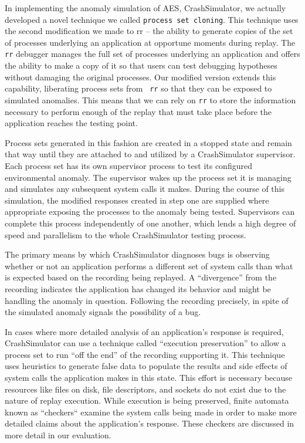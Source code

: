 In implementing the anomaly simulation of AES,
CrashSimulator, we actually developed
a novel technique
we called {\tt process set cloning}.  This technique uses the second
modification we made to rr -- the ability to generate copies of the set of
processes underlying an application at opportune moments during replay.
The {\tt rr} debugger manages
the full set of processes underlying an application
and offers the ability to
make a copy of it so that users can test debugging
hypotheses without damaging the original processes.
Our modified version
extends this capability, liberating process sets from {\tt
rr} so that they can be exposed to simulated anomalies.
This means that we can rely on {\tt rr}
to store the information necessary to perform enough of the
replay that must take place before the application reaches the
testing point.

Process sets generated in this fashion are created in a stopped state and
remain that way until they are attached to and utilized by a CrashSimulator
supervisor.  Each process set has its own supervisor process to test
its configured environmental anomaly.  The
supervisor wakes up the process set it is managing and simulates any
subsequent system calls it makes.
During the course of this simulation, the modified responses created in
step one are supplied where appropriate exposing the processes to the
anomaly being tested.
Supervisors can complete this
process independently of one another, which lends a
high degree of speed and
parallelism to the whole CrashSimulator testing process.

The primary means by which
CrashSimulator diagnoses bugs is observing whether or not an application
performs a different set of system calls than what is expected based on the
recording being replayed.  A ``divergence'' from the recording indicates
the application has changed its behavior and might be handling
the anomaly in question.  Following the recording precisely, in spite of
the simulated anomaly signals the possibility of a bug.

In cases where more detailed analysis of an application's response
is required, CrashSimulator can use a
technique called ``execution preservation'' to allow a process set to run
``off the end'' of the recording supporting it.  This technique uses
heuristics to generate false data to populate the results and
side effects of system calls the application makes in this state.  This
effort is necessary because resources like files on disk, file descriptors,
and sockets do not exist due to the nature of replay execution.  While
execution is being preserved, finite automata known as ``checkers`` examine
the system calls being made in order to make more detailed claims about the
application's response.  These checkers are discussed in more detail in our
evaluation.
